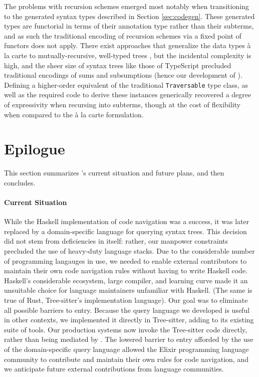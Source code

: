 \documentclass[acmsmall,fleqn]{acmart}
\begin{document}
The problems with recursion schemes emerged most notably when transitioning to
the generated syntax types described in Section \ref{sec:codegen}. These generated types are
functorial in terms of their annotation type rather than their subterms, and as
such the traditional encoding of recursion schemes via a fixed point of functors
does not apply. There exist approaches that generalize the data types à la carte
to mutually-recursive, well-typed trees \cite{bahr11compositional}, but the
incidental complexity is high, and the sheer size of syntax trees like those of
TypeScript precluded traditional encodings of sums and subsumptions (hence our
development of \fastsum{}). Defining a higher-order equivalent of the
traditional \texttt{Traversable} type class, as well as the required code to
derive these instances generically \cite{Magalhaes10generic} recovered a
degree of expressivity when recursing into subterms, though at the cost of
flexibility when compared to the à la carte formulation.

\section{Epilogue}
\label{sec:conclusion}
This section summarizes \semantic's current situation and future plans,
and then concludes.

\paragraph{Current Situation}
%
While the Haskell implementation of code navigation was a success, it was
later replaced by a domain-specific language for querying syntax trees. This
decision did not stem from deficiencies in \semantic{} itself: rather, our
manpower constraints precluded the use of heavy-duty language stacks. Due to
the considerable number of programming langauges in use, we needed to enable
external contributors to maintain their own code navigation rules without
having to write Haskell code. Haskell’s considerable ecosystem, large
compiler, and learning curve made it an unsuitable choice for language
maintainers unfamiliar with Haskell. (The same is true of Rust, Tree-sitter's
implementation language). Our goal was to eliminate all possible
barriers to entry. Because the query language we developed is useful in
other contexts, we implemented it directly in Tree-sitter, adding to its
existing suite of tools. Our production systems now invoke the Tree-sitter
code directly, rather than being mediated by \semantic{}. The lowered
barrier to entry afforded by the use of the domain-specific query language
allowed the Elixir programming language community to contribute and maintain
their own rules for code navigation, and we anticipate future external
contributions from language communities.
\end{document}
